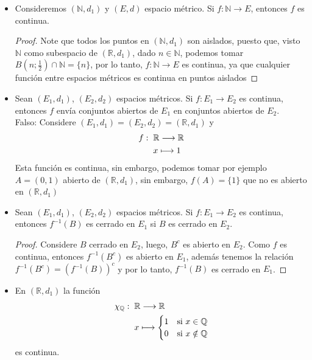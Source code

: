 \begin{itemize}[label={✎},leftmargin=*]

\item Consideremos $(\mathbb{N},d_1)$ y $(E,d)$ espacio métrico. Si $f: \mathbb{N} \longrightarrow E$, entonces $f$ es continua.\\

\begin{proof}
 Note que todos los puntos en $(\mathbb{N},d_1)$ son aislados, puesto que, visto $\mathbb{N}$ como subespacio de $(\mathbb{R},d_1)$, dado $n \in \mathbb{N}$, podemos tomar $B(n;\frac{1}{2}) \cap \mathbb{N}=\{n\}$, por lo tanto, $f: \mathbb{N} \longrightarrow E$ es continua, ya que cualquier función entre espacios métricos es continua en puntos aislados
\end{proof}

\item Sean $(E_1,d_1)$, $(E_2,d_2)$ espacios métricos. Si $f: E_1 \longrightarrow E_2$ es continua, entonces $f$ envía conjuntos abiertos de $E_1$ en conjuntos abiertos de $E_2$.\\

Falso: Considere  $(E_1,d_1)=(E_2,d_2)=(\mathbb{R},d_1)$ y 
    \begin{align*}
        f: \hspace{2mm} &\mathbb{R} \longrightarrow \mathbb{R}\\
        &x \longmapsto 1 
    \end{align*}
    Esta función es continua, sin embargo, podemos tomar por ejemplo $A=(0,1)$ abierto de $(\mathbb{R},d_1)$, sin embargo, $f(A)=\{1\}$ que no es abierto en $(\mathbb{R},d_1)$

\item Sean $(E_1,d_1)$, $(E_2,d_2)$ espacios métricos. Si $f: E_1 \longrightarrow E_2$ es continua, entonces $f^{-1}(B)$ es cerrado en $E_1$ si $B$ es cerrado en $E_2$.\\

\begin{proof}
 Considere $B$ cerrado en $E_2$, luego, $B^c$ es abierto en $E_2$. Como $f$ es continua, entonces $f^{-1}(B^c)$ es abierto en $E_1$, además tenemos la relación $f^{-1}(B^c)=(f^{-1}(B))^c$ y por lo tanto, $f^{-1}(B)$ es cerrado en $E_1$.
\end{proof}

\item En $(\mathbb{R},d_1)$ la función
\begin{align*}
    \chi_\mathbb{Q}: \hspace{2mm} &\mathbb{R} \longrightarrow \mathbb{R}\\
    &x \longmapsto \begin{cases}
        1 & \text{si } x\in \mathbb{Q}\\
        0 & \text{si } x \notin \mathbb{Q}
    \end{cases}
\end{align*}
es continua.


\end{itemize}

